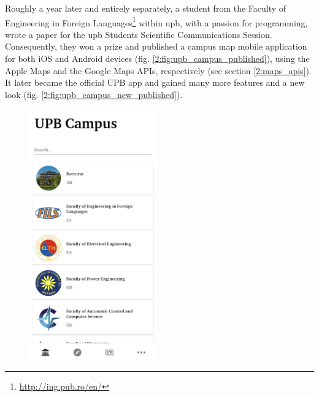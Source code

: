     \newpage
    
    Roughly a year later and entirely separately, a student from the Faculty of Engineering in Foreign Languages\footnote{\url{http://ing.pub.ro/en/}} within \acrshort{upb}, with a passion for programming,  wrote a paper\cite{scurtu2020upb} for the \acrshort{upb} Students Scientific Communications Session. Consequently, they won a prize and published a campus map mobile application for both iOS and Android devices (fig. \ref{2:fig:upb_campus_published}), using the Apple Maps and the Google Maps APIs, respectively (see section \ref{2:maps_apis}). It later became the official UPB app and gained many more features and a new look (fig. \ref{2:fig:upb_campus_new_published}).
    
    \begin{figure}[!ht]
        \centering
        \begin{minipage}[b]{0.49\textwidth}
            \captionsetup{justification=centering}
             \includegraphics[width=0.49\textwidth]{figures/navigation_apps/upb_campus_published1.png}

\end{minipage}
\end{figure}
